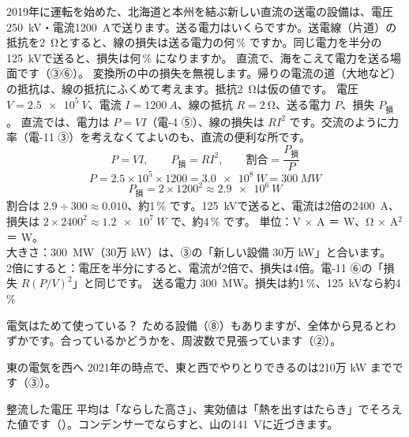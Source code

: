 \begin{phreidai}[直流で北海道へ送る]\label{ph:電-16:ex4}
2019年に運転を始めた、北海道と本州を結ぶ新しい直流の送電の設備は、電圧\qty{250}{kV}・電流\qty{1200}{A}で送ります。送る電力はいくらですか。送電線（片道）の抵抗を\qty{2}{\ohm}とすると、線の損失は送る電力の何\,\% ですか。同じ電力を半分の\qty{125}{kV}で送ると、損失は何\,\% になりますか。
\phbamen
直流で、海をこえて電力を送る場面です（③⑥）。
\phmushi
変換所の中の損失を無視します。帰りの電流の道（大地など）の抵抗は、線の抵抗にふくめて考えます。抵抗\qty{2}{\ohm}は仮の値です。
\phzu
電圧 $V=\qty{2.5e5}{V}$、電流 $I=\qty{1200}{A}$、線の抵抗 $R=\qty{2}{\ohm}$、送る電力 $P$、損失 $P_{\text{損}}$。
\phriyu
直流では、電力は $P=VI$（電-4 ⑤）、線の損失は $RI^2$ です。交流のように力率（電-11 ③）を考えなくてよいのも、直流の便利な所です。
\phtateru
\[P=VI,\qquad P_{\text{損}}=RI^2,\qquad \text{割合}=\frac{P_{\text{損}}}{P}\]
\phtoku
\[P=2.5\times10^5\times1200=\qty{3.0e8}{W}=\qty{300}{MW}\]
\[P_{\text{損}}=2\times1200^2\approx\qty{2.9e6}{W}\]
割合は $2.9\div300\approx0.010$、約1\,\% です。\qty{125}{kV}で送ると、電流は2倍の\qty{2400}{A}、損失は $2\times2400^2\approx\qty{1.2e7}{W}$ で、約4\,\% です。
\phtashikame
単位：V × A ＝ W、Ω × A$^2$ ＝ W。\\
大きさ：\qty{300}{MW}（30万 kW）は、③の「新しい設備 30万 kW」と合います。\\
2倍にすると：電圧を半分にすると、電流が2倍で、損失は4倍。電-11 ⑥の「損失 $R(P/V)^2$」と同じです。
\kotae 送る電力 \qty{300}{MW}。損失は約1\,\%、\qty{125}{kV}なら約4\,\%
\end{phreidai}

\begin{tsumazuki}{電気はためて使っている？}
ためる設備（⑧）もありますが、全体から見るとわずかです。合っているかどうかを、周波数で見張っています（②）。
\end{tsumazuki}
\begin{tsumazuki}{東の電気を西へ}
2021年の時点で、東と西でやりとりできるのは210万 kW までです（③）。
\end{tsumazuki}
\begin{tsumazuki}{整流した電圧}
平均は「ならした高さ」、実効値は「熱を出すはたらき」でそろえた値です（）。コンデンサーでならすと、山の\qty{141}{V}に近づきます。
\end{tsumazuki}

